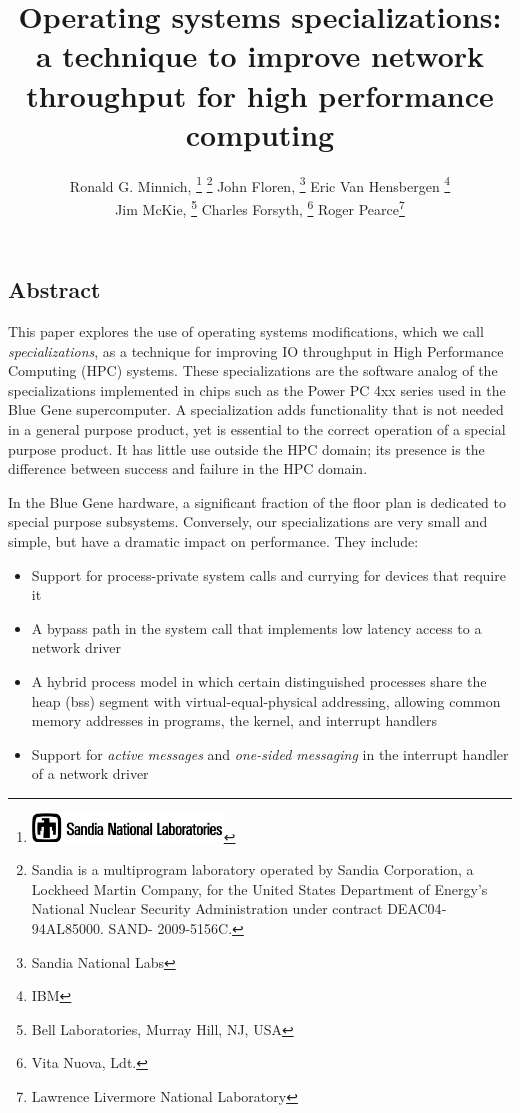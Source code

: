 \documentclass[letterpaper,twocolumn,10pt]{article}
\date{}
\begin{document}
\author{Ronald G. Minnich, %
\thanks{\protect\includegraphics[height=0.3in]{thunderchicken}%
}%
\thanks{Sandia is a multiprogram laboratory operated by Sandia Corporation, a Lockheed Martin Company, for the United States Department of Energy’s National Nuclear Security Administration under contract DE­AC04­94AL85000. SAND- 2009-5156C.}  
John Floren, \thanks{Sandia National Labs} 
Eric Van Hensbergen \thanks{IBM} 
\\ 
Jim McKie, 
\thanks{Bell Laboratories, Murray Hill, NJ, USA }
Charles Forsyth, 
\thanks{Vita Nuova, Ldt.} 
Roger Pearce\thanks{Lawrence Livermore National Laboratory}
}

\title{\Large \bf Operating systems specializations: a technique to improve network  throughput for high performance computing}
\maketitle
\thispagestyle{empty}
\pagestyle{empty}
\subsection*{Abstract}
This paper explores the use of operating systems modifications, which we call {\em specializations}, as a technique for improving IO throughput in High Performance Computing (HPC) systems. 
These specializations are the software analog of the specializations implemented in chips such as the Power PC 4xx series used in the Blue Gene supercomputer. A 
specialization adds functionality that is not needed in a general purpose product, yet is essential to the correct operation of a special purpose product. It has  little use 
outside the HPC domain; its presence is the difference between success and failure in the HPC domain. 

In the Blue Gene hardware, a significant fraction of the floor plan is dedicated to special purpose subsystems. Conversely, our specializations are very small and simple, but have a dramatic impact on performance. 
They include: 
\begin{itemize}
\item Support for process-private system calls and currying for devices that require it
\item A bypass path in the system call that implements low latency access to a network driver
\item A hybrid process model in which certain distinguished processes share the heap (bss) segment with virtual-equal-physical addressing, allowing common memory addresses in programs, the kernel, and interrupt handlers
\item Support for {\em active messages} and {\em one-sided messaging} in the interrupt handler of a network driver
\end{itemize}
\end{document}
